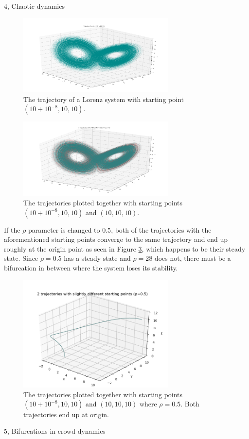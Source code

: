 \documentclass[10pt,a4paper]{article}
\begin{document}
\begin{task}{4, Chaotic dynamics}
\begin{figure}[H]
    \centering
    \includegraphics[width=0.7\textwidth]{../plots/lorenz_2.png}
    \caption{The trajectory of a Lorenz system with starting point $(10+10^{-8}, 10, 10)$.}
    \label{fig:lorenz_2}
\end{figure}

\begin{figure}[H]
    \centering
    \includegraphics[width=0.7\textwidth]{../plots/lorenz_3.png}
    \caption{The trajectories plotted together with starting points $(10+10^{-8}, 10, 10)$ and $(10, 10, 10)$.}
    \label{fig:lorenz_3}
\end{figure}

If the $\rho$ parameter is changed to $0.5$, both of the trajectories with the aforementioned starting points converge to the same trajectory and end up roughly at the origin point as seen in Figure \ref{fig:lorenz_4}, which happens to be their steady state. Since $\rho=0.5$ has a steady state and $\rho=28$ does not, there must be a bifurcation in between where the system loses its stability. \\

\begin{figure}[H]
    \centering
    \includegraphics[width=0.7\textwidth]{../plots/lorenz_4.png}
    \caption{The trajectories plotted together with starting points $(10+10^{-8}, 10, 10)$ and $(10, 10, 10)$ where $\rho=0.5$. Both trajectories end up at origin.}
    \label{fig:lorenz_4}
\end{figure}

\end{task}
\begin{task}{5, Bifurcations in crowd dynamics}
\end{task}
\end{document}
